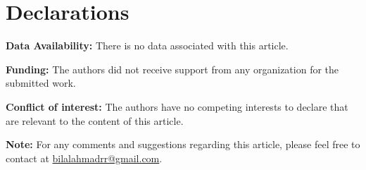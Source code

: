 \documentclass[12pt]{article}
\theoremstyle{definition}
\begin{document}
\medskip

\section*{Declarations}
\noindent \textbf{Data Availability:} There is no data associated with this article.

\medskip

\noindent \textbf{Funding:} The authors did not receive support from any organization for the submitted work.

\medskip

\noindent \textbf{Conflict of interest:} The authors have no competing interests to declare that are relevant to the content of this article.

\medskip

\noindent\textbf{Note:} For any comments and suggestions regarding this article, please feel free to contact at \href{mailto:bilalahmadrr@gmail.com}{bilalahmadrr@gmail.com}.
\end{document}
